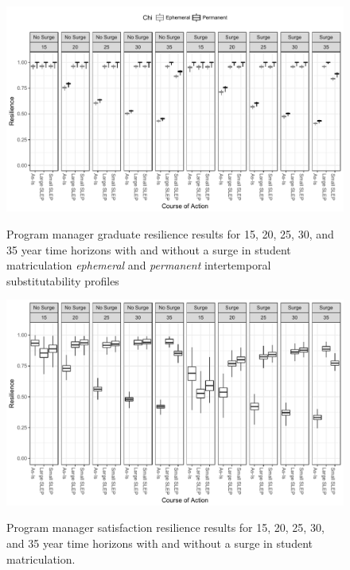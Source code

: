 \documentclass[preprint,12pt]{elsarticle}
\begin{document}
\begin{landscape}
\begin{figure}[h]
  \begin{center}
    \includegraphics[width=8.2in]{PMGradTH}
  \end{center}
\begin{quote}
  \caption[Program manager graduate resilience results]{Program
    manager graduate resilience results for 15, 20, 25, 30, and 35 
    year time horizons with and without a surge in student
    matriculation \emph{ephemeral} and \emph{permanent} intertemporal
    substitutability profiles
  \label{f:PMGradTH}}
\end{quote}
\end{figure}
\end{landscape}

\begin{landscape}
\begin{figure}[h]
  \begin{center}
    \includegraphics[width=8.2in]{PMSatTH}
  \end{center}
\begin{quote}
  \caption[Program manager satisfaction resilience results]{Program
    manager satisfaction resilience results for 15, 20, 25, 30, and 35
    year time horizons with and without a surge in student matriculation.
    \label{f:PMSatTH}}
\end{quote}
\end{figure}
\end{landscape}
\end{document}
